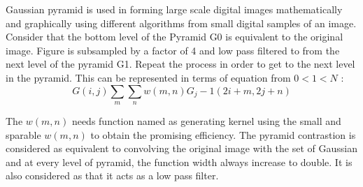 Gaussian pyramid \cite{Aurich} is used in forming large scale digital images mathematically and graphically using different algorithms from small digital samples of an image.  Consider that the bottom level of the Pyramid G0 is equivalent to the original image. Figure is subsampled by a factor of 4 and low pass filtered to from the next level of the pyramid G1. Repeat the process in order
to get to the next level in the pyramid. This can be represented in terms of
equation from $0 < 1 < N$ : 
\begin{displaymath}
G\left ( i,j \right ) \sum_{m} \sum_{n} w\left ( m,n \right )G_{j}-1\left ( 2i+m,2j+n \right )
\end{displaymath}

The $w\left ( m,n \right )$ needs function named as generating kernel using the small and sparable $w\left ( m,n \right )$ to obtain the promising efficiency. The pyramid contrastion is considered as equivalent to convolving the original image with the set of Gaussian and at every level of pyramid, the function width always increase to double. It is also considered as that it acts as a low pass filter.\\

